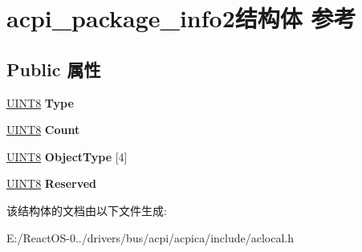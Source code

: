 \hypertarget{structacpi__package__info2}{}\section{acpi\+\_\+package\+\_\+info2结构体 参考}
\label{structacpi__package__info2}
\subsection*{Public 属性}
\begin{DoxyCompactItemize}
\item 
\mbox{\label{structacpi__package__info2_aa3a60fd5d2ac5d4cf32500a7d4b70156}} 
\hyperlink{_processor_bind_8h_ab27e9918b538ce9d8ca692479b375b6a}{U\+I\+N\+T8} {\bfseries Type}
\item 
\mbox{\label{structacpi__package__info2_aa0bde071368e6bcae8fa42a8fc84d1b1}} 
\hyperlink{_processor_bind_8h_ab27e9918b538ce9d8ca692479b375b6a}{U\+I\+N\+T8} {\bfseries Count}
\item 
\mbox{\label{structacpi__package__info2_a6deb2604a89e31c52953d3f9e7bbd91a}} 
\hyperlink{_processor_bind_8h_ab27e9918b538ce9d8ca692479b375b6a}{U\+I\+N\+T8} {\bfseries Object\+Type} \mbox{[}4\mbox{]}
\item 
\mbox{\label{structacpi__package__info2_a5d8d7f186b6247830f20ebe998f43d45}} 
\hyperlink{_processor_bind_8h_ab27e9918b538ce9d8ca692479b375b6a}{U\+I\+N\+T8} {\bfseries Reserved}
\end{DoxyCompactItemize}


该结构体的文档由以下文件生成\+:\begin{DoxyCompactItemize}
\item 
E\+:/\+React\+O\+S-\/0../drivers/bus/acpi/acpica/include/aclocal.\+h\end{DoxyCompactItemize}
